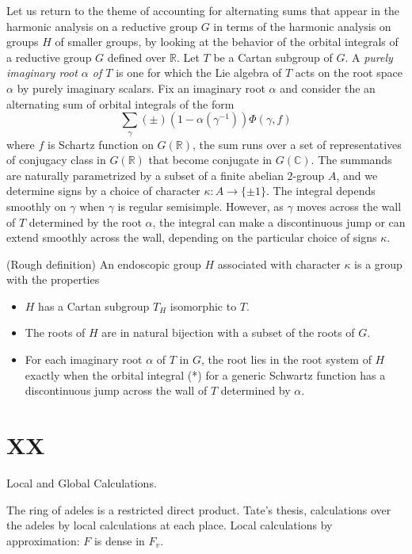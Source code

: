 \documentclass[brochure,english,12pt]{bourbaki}
\newcommand{\ring}[1]{\mathbb{#1}}
\begin{document}
Let us return to the theme of accounting for alternating sums that
appear in the harmonic analysis on a reductive group $G$ in terms of
the harmonic analysis on groups $H$ of smaller groups, by looking at
the behavior of the orbital integrals of a reductive group $G$ defined
over $\ring{R}$.  Let $T$ be a Cartan subgroup of $G$.  A {\it purely
  imaginary root $\alpha$ of $T$} is one for which the Lie algebra of $T$
acts on the root space $\alpha$ by purely imaginary scalars.
Fix an imaginary root $\alpha$ and
consider the an alternating sum of orbital integrals of the form
\[
\sum_\gamma (\pm) (1-\alpha(\gamma^{-1})) \Phi(\gamma,f)
\]
where $f$ is Schartz function on $G(\ring{R})$, the sum runs over a
set of representatives of conjugacy class in $G(\ring{R})$ that become
conjugate in $G(\ring{C})$.  The summands are naturally parametrized
by a subset of a finite abelian $2$-group $A$, and we determine signs
by a choice of character $\kappa:A\to \{ \pm1 \}$.  The integral
depends smoothly on $\gamma$ when $\gamma$ is regular semisimple.
However, as $\gamma$ moves across the wall of $T$ determined by the
root $\alpha$, the integral can make a discontinuous jump or can extend
smoothly across the wall, depending on the particular choice of signs
$\kappa$.  

\begin{definition}
(Rough definition)
An endoscopic group $H$ associated with character $\kappa$ is a group
with the properties
\begin{itemize}
\item $H$ has a Cartan subgroup $T_H$ isomorphic to $T$.
\item The roots of $H$ are in natural bijection with a subset of the roots of $G$.
\item For each imaginary root $\alpha$ of $T$ in $G$, the root
lies in the root system of $H$ exactly when the orbital integral (*)
for a generic Schwartz function has a discontinuous jump across 
the wall of $T$ determined by $\alpha$.
\end{itemize}
\end{definition}


\section{XX}
Local and Global Calculations.

The ring of adeles is a restricted direct product.  Tate's thesis,
calculations over the adeles by local calculations at each place.
Local calculations by approximation: $F$ is dense in $F_v$.
\end{document}

